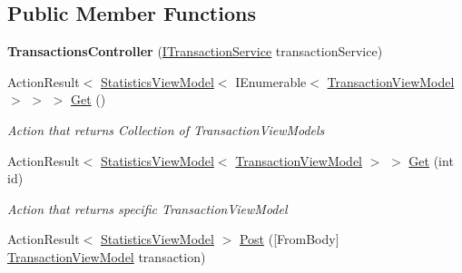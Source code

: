 \subsection*{Public Member Functions}
\begin{DoxyCompactItemize}
\item 
\mbox{\label{class_gielda_l2_1_1_a_p_i_1_1_controllers_1_1_transactions_controller_a2a4794c254bb219f7323fbb38070079a}} 
{\bfseries Transactions\+Controller} (\mbox{\hyperlink{interface_gielda_l2_1_1_i_n_f_r_a_s_t_r_u_c_t_u_r_e_1_1_interfaces_1_1_i_transaction_service}{I\+Transaction\+Service}} transaction\+Service)
\item 
Action\+Result$<$ \mbox{\hyperlink{class_gielda_l2_1_1_a_p_i_1_1_view_models_1_1_view_1_1_statistics_view_model}{Statistics\+View\+Model}}$<$ I\+Enumerable$<$ \mbox{\hyperlink{class_gielda_l2_1_1_a_p_i_1_1_view_models_1_1_view_1_1_transaction_view_model}{Transaction\+View\+Model}} $>$ $>$ $>$ \mbox{\hyperlink{class_gielda_l2_1_1_a_p_i_1_1_controllers_1_1_transactions_controller_a6f3816a2e97328c17ff0aff554c476ad}{Get}} ()
\begin{DoxyCompactList}\small\item\em Action that returns Collection of Transaction\+View\+Models \end{DoxyCompactList}\item 
Action\+Result$<$ \mbox{\hyperlink{class_gielda_l2_1_1_a_p_i_1_1_view_models_1_1_view_1_1_statistics_view_model}{Statistics\+View\+Model}}$<$ \mbox{\hyperlink{class_gielda_l2_1_1_a_p_i_1_1_view_models_1_1_view_1_1_transaction_view_model}{Transaction\+View\+Model}} $>$ $>$ \mbox{\hyperlink{class_gielda_l2_1_1_a_p_i_1_1_controllers_1_1_transactions_controller_a2bd1feea8d75f19e65ccf986a1d65300}{Get}} (int id)
\begin{DoxyCompactList}\small\item\em Action that returns specific Transaction\+View\+Model \end{DoxyCompactList}\item 
Action\+Result$<$ \mbox{\hyperlink{class_gielda_l2_1_1_a_p_i_1_1_view_models_1_1_view_1_1_statistics_view_model}{Statistics\+View\+Model}} $>$ \mbox{\hyperlink{class_gielda_l2_1_1_a_p_i_1_1_controllers_1_1_transactions_controller_a48d1aa784d4c914cecc27b33b33f47a1}{Post}} (\mbox{[}From\+Body\mbox{]} \mbox{\hyperlink{class_gielda_l2_1_1_a_p_i_1_1_view_models_1_1_view_1_1_transaction_view_model}{Transaction\+View\+Model}} transaction)

\end{DoxyCompactItemize}
